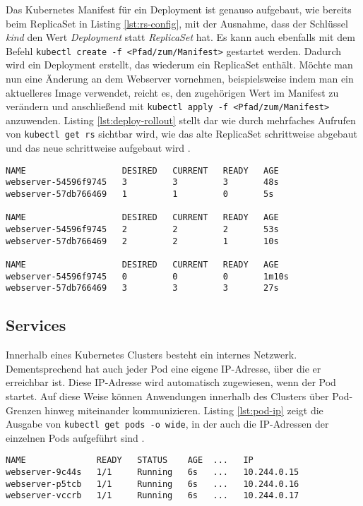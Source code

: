 \documentclass[11pt,a4paper]{article}
\begin{document}
Das Kubernetes Manifest für ein Deployment ist genauso aufgebaut, wie bereits beim ReplicaSet in
Listing \ref{lst:rs-config}, mit der Ausnahme, dass der Schlüssel \emph{kind} den Wert
\emph{Deployment} statt \emph{ReplicaSet} hat. Es kann auch ebenfalls mit dem Befehl
\lstinline|kubectl create -f <Pfad/zum/Manifest>| gestartet werden.
Dadurch wird ein Deployment erstellt, das wiederum ein ReplicaSet enthält.
Möchte man nun eine Änderung an dem Webserver vornehmen, beispielsweise indem
man ein aktuelleres Image verwendet, reicht es, den zugehörigen Wert im Manifest
zu verändern und anschließend mit \lstinline|kubectl apply -f <Pfad/zum/Manifest>| anzuwenden.
Listing \ref{lst:deploy-rollout} stellt dar wie durch mehrfaches Aufrufen
von \lstinline|kubectl get rs| sichtbar wird, wie das alte
ReplicaSet schrittweise abgebaut und das neue schrittweise aufgebaut wird \cite{Schmeling_Dargatz_2022}.

\begin{lstlisting}[caption={Ein Deployment, das schrittweise ein Update ausführt.}, label={lst:deploy-rollout}]
NAME                   DESIRED   CURRENT   READY   AGE
webserver-54596f9745   3         3         3       48s
webserver-57db766469   1         1         0       5s

NAME                   DESIRED   CURRENT   READY   AGE
webserver-54596f9745   2         2         2       53s
webserver-57db766469   2         2         1       10s

NAME                   DESIRED   CURRENT   READY   AGE
webserver-54596f9745   0         0         0       1m10s
webserver-57db766469   3         3         3       27s

\end{lstlisting}

\subsection{Services}
Innerhalb eines Kubernetes Clusters besteht ein internes Netzwerk. Dementsprechend hat auch jeder Pod
eine eigene IP-Adresse, über die er erreichbar ist. Diese IP-Adresse wird automatisch zugewiesen, wenn der Pod startet.
Auf diese Weise können Anwendungen innerhalb des Clusters über Pod-Grenzen hinweg miteinander kommunizieren.
Listing \ref{lst:pod-ip} zeigt die Ausgabe von \lstinline|kubectl get pods -o wide|, in der auch die IP-Adressen
der einzelnen Pods aufgeführt sind \cite{Schmeling_Dargatz_2022}.
\begin{lstlisting}[caption={\lstinline|kubectl get pods -o wide| veranschautlicht, dass jeder Pod seine eigene IP-Adresse erhält. Die Ausgabe wurde zur besseren Lesbarkeit gekürzt.}, label={lst:pod-ip}]
NAME              READY   STATUS    AGE  ...   IP           
webserver-9c44s   1/1     Running   6s   ...   10.244.0.15
webserver-p5tcb   1/1     Running   6s   ...   10.244.0.16
webserver-vccrb   1/1     Running   6s   ...   10.244.0.17
\end{lstlisting}
\end{document}
